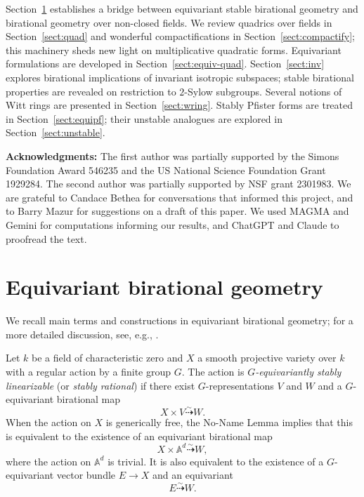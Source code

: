 \documentclass[12pt]{amsart}
\numberwithin{equation}{section}
\newcommand{\bA}{\mathbb{A}}
\theoremstyle{plain}
\theoremstyle{definition}
\theoremstyle{remark}
\begin{document}
Section~\ref{sect:equiv} establishes a bridge between equivariant
stable birational geometry and birational geometry over non-closed fields.
We review quadrics over fields in Section~\ref{sect:quad} and
wonderful compactifications in Section~\ref{sect:compactify}; 
this machinery sheds new light on multiplicative quadratic
forms. Equivariant
formulations are developed in Section~\ref{sect:equiv-quad}.
Section~\ref{sect:inv} explores birational implications of 
invariant isotropic subspaces; stable birational properties are revealed
on restriction to $2$-Sylow subgroups. Several notions of
Witt rings are presented in Section~\ref{sect:wring}.
Stably Pfister forms are treated in Section~\ref{sect:equipf};
their unstable analogues are explored 
in Section~\ref{sect:unstable}. 







\medskip
\noindent
\textbf{Acknowledgments:}
The first author was partially supported by the Simons Foundation
Award 546235 and the US National Science Foundation Grant 1929284.
The second author was partially supported by NSF grant 2301983.
We are grateful to Candace Bethea for conversations that
informed this project, and to Barry Mazur for suggestions on a draft
of this paper. We used MAGMA \cite{MAGMA} and Gemini for computations informing our results, and ChatGPT
and Claude to proofread the text. 

\section{Equivariant birational geometry}
\label{sect:equiv}
We recall main terms and constructions in equivariant birational geometry; for a more detailed discussion, see, e.g., \cite[Sec. 2]{HTPAMQ}. 


Let $k$ be a field of characteristic zero and $X$ a smooth projective variety over $k$ with a regular action by a finite group $G$.
The action is {\em $G$-equivariantly stably linearizable} (or {\em stably rational}) if there exist $G$-representations $V$
and $W$ and a $G$-equivariant birational map
$$X \times V \stackrel{\sim}{\dashrightarrow} W.$$ 
When the action on $X$ is generically free, the No-Name Lemma implies that this is equivalent
to the existence of an equivariant birational map
$$X  \times \bA^d \stackrel{\sim}{\dashrightarrow} W,$$
where the action on $\bA^d$ is trivial. It is also equivalent to the existence 
of a $G$-equivariant vector bundle $E \rightarrow X$ and an equivariant
$$E \stackrel{\sim}{\dashrightarrow} W.$$
\end{document}
